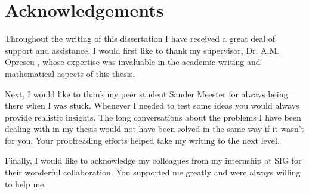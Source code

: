 \chapter*{Acknowledgements}
Throughout the writing of this dissertation I have received a great deal of support and assistance. I would first like to thank my supervisor, Dr. A.M. Oprescu , whose expertise was invaluable in the academic writing and mathematical aspects of this thesis.

Next, I would like to thank my peer student Sander Meester for always being there when I was stuck. Whenever I needed to test some ideas you would always provide realistic insights. The long conversations about the problems I have been dealing with in my thesis would not have been solved in the same way if it wasn't for you. Your proofreading efforts helped take my writing to the next level.

Finally, I would like to acknowledge my colleagues from my internship at SIG for their wonderful collaboration. You supported me greatly and were always willing to help me.
